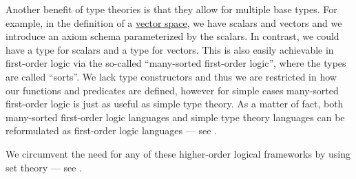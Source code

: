 \begin{remark}
  Another benefit of type theories is that they allow for multiple base types. For example, in the definition of a \hyperref[def:vector_space]{vector space}, we have scalars and vectors and we introduce an axiom schema parameterized by the scalars. In contrast, we could have a type for scalars and a type for vectors. This is also easily achievable in first-order logic via the so-called \enquote{many-sorted first-order logic}, where the types are called \enquote{sorts}. We lack type constructors and thus we are restricted in how our functions and predicates are defined, however for simple cases many-sorted first-order logic is just as useful as simple type theory. As a matter of fact, both many-sorted first-order logic languages and simple type theory languages can be reformulated as first-order logic languages --- see \cite[ch. 8]{Farmer2008}.

  We circumvent the need for any of these higher-order logical frameworks by using set theory --- see .
\end{remark}

